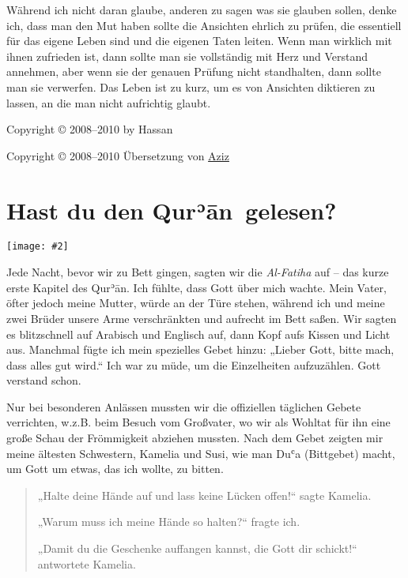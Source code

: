 \documentclass[12pt]{memoir}
\def\´{ʾ} %
\def\`{ʿ} %
\def \Quran{Qur\-\´ān} %
\newcommand{\img}[3]{\begin{center}%
\texttt{[image: \#2]}\\{\small\em#3}%
\end{center}}
\begin{document}
Während ich nicht daran glaube, anderen zu sagen was sie glauben sollen,
denke ich, dass man den Mut haben sollte die Ansichten ehrlich zu prüfen,
die essentiell für das eigene Leben sind und die eigenen Taten leiten.
Wenn man wirklich mit ihnen zufrieden ist,
dann sollte man sie vollständig mit Herz und Verstand annehmen,
aber wenn sie der genauen Prüfung nicht standhalten,
dann sollte man sie verwerfen.
Das Leben ist zu kurz, um es von Ansichten diktieren zu lassen,
an die man nicht aufrichtig glaubt.

\hfill Copyright © 2008–2010 by Hassan

\hfill Copyright © 2008–2010 Übersetzung von
\href{mailto:alsana.aziz@gmail.com}{Aziz}

\mainmatter


\chapter{Hast du den \Quran\ gelesen?}

\img{scale=0.7}{Baby_Hassan.jpg}{}

Jede Nacht, bevor wir zu Bett gingen, sagten wir die \emph{Al-Fatiha} auf –
das kurze erste Kapitel des \Quran.
Ich fühlte, dass Gott über mich wachte.
Mein Vater, öfter jedoch meine Mutter, würde an der Türe stehen,
während ich und meine zwei Brüder unsere Arme verschränkten
und aufrecht im Bett saßen.
Wir sagten es blitzschnell auf Arabisch und Englisch auf,
dann Kopf aufs Kissen und Licht aus.
Manchmal fügte ich mein spezielles Gebet hinzu:
„Lieber Gott, bitte mach, dass alles gut wird.“
Ich war zu müde, um die Einzelheiten aufzuzählen.
Gott verstand schon.

Nur bei besonderen Anlässen mussten wir
die offiziellen täglichen Gebete verrichten,
w.z.B. beim Besuch vom Großvater,
wo wir als Wohltat für ihn eine große Schau der Frömmigkeit abziehen mussten.
Nach dem Gebet zeigten mir meine ältesten Schwestern, Kamelia und Susi,
wie man Du\`a (Bittgebet) macht, um Gott um etwas, das ich wollte, zu bitten.

\begin{quote}
„Halte deine Hände auf und lass keine Lücken offen!“ sagte Kamelia.

„Warum muss ich meine Hände so halten?“ fragte ich.

„Damit du die Geschenke auffangen kannst, die Gott dir schickt!“
antwortete Kamelia.
\end{quote}
\end{document}
